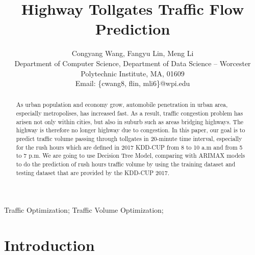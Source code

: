 \documentclass[journal, letterpaper]{IEEEtran}
\begin{document}
\title{Highway Tollgates Traffic Flow Prediction}
\author{Congyang Wang, Fangyu Lin, Meng Li \\ Department of Computer Science, Department of Data Science -- Worcester Polytechnic Institute, MA, 01609 \\ Email: \{cwang8, flin, mli6\}@wpi.edu}
\maketitle

\begin{abstract} 
\large
As urban population and economy grow, automobile penetration in urban area, especially metropolises, has increased fast. As a result, traffic congestion problem has arisen not only within cities, but also in suburb such as areas bridging highways. The highway is therefore no longer highway due to congestion. In this paper, our goal is to predict traffic volume passing through tollgates in 20-minute time interval, especially for the rush hours which are defined in 2017 KDD-CUP from 8 to 10 a.m and from 5 to 7 p.m. We are going to use Decision Tree Model, comparing with ARIMAX models to do the prediction of rush hours traffic volume by using the training dataset and testing dataset that are provided by the KDD-CUP 2017. 
\end{abstract}

\begin{IEEEkeywords}
Traffic Optimization;
Traffic Volume Optimization;
\end{IEEEkeywords}

\section{Introduction}
\large
\end{document}
